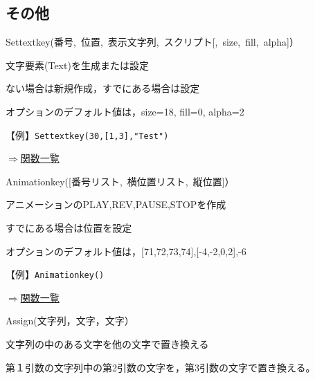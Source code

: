 \documentclass[papersize,a4paper,10pt,uplatex]{jsarticle}
\begin{document}
\subsection{その他}

\begin{description}


\hypertarget{settextkey}{}
\item[関数]Settextkey(番号,\ 位置,\ 表示文字列,\ スクリプト[,\ size,\ fill,\ alpha]）
\item[機能]文字要素(Text)を生成または設定
\item[説明]ない場合は新規作成，すでにある場合は設定

オプションのデフォルト値は，size=18, fill=0, alpha=2

\vspace{\baselineskip}
【例】\verb|Settextkey(30,[1,3],"Test")|

\begin{flushright}\hyperlink{functionlist}{$\Rightarrow$関数一覧}\end{flushright}

\hypertarget{Animationkey}{}
\item[関数]Animationkey([番号リスト,\ 横位置リスト,\ 縦位置]）
\item[機能]アニメーションのPLAY,REV,PAUSE,STOPを作成
\item[説明]すでにある場合は位置を設定

オプションのデフォルト値は，[71,72,73,74],[-4,-2,0,2],-6

\vspace{\baselineskip}
【例】\verb|Animationkey()|

\begin{flushright}\hyperlink{functionlist}{$\Rightarrow$関数一覧}\end{flushright}

\hypertarget{assign}{}
\item[関数]Assign(文字列，文字，文字）
\item[機能]文字列の中のある文字を他の文字で置き換える
\item[説明]第１引数の文字列中の第2引数の文字を，第3引数の文字で置き換える。


\end{description}
\end{document}

